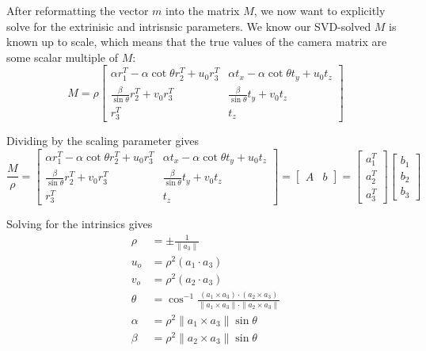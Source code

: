 \documentclass[a4paper, 12pt]{article}
\begin{document}
After reformatting the vector $m$ into the matrix $M$, we now want to explicitly solve for the extrinisic and intrisnsic parameters. We know our SVD-solved $M$ is known up to scale, which means that the true values of the camera matrix are some scalar multiple of $M$:
\begin{equation}
M = \rho\begin{bmatrix}
\alpha r_1^T - \alpha\cot \theta r_2^T + u_0r_3^T & \alpha t_x - \alpha \cot \theta t_y + u_0 t_z \\
\frac{\beta}{\sin\theta}r_2^T + v_0r_3^T & \frac{\beta}{\sin\theta}t_y + v_0t_z \\ r_3^T & t_z
\end{bmatrix}
\end{equation}

Dividing by the scaling parameter gives
\[\frac{M}{\rho} = \begin{bmatrix}
\alpha r_1^T - \alpha\cot \theta r_2^T + u_0r_3^T & \alpha t_x - \alpha \cot \theta t_y + u_0 t_z \\
\frac{\beta}{\sin\theta}r_2^T + v_0r_3^T & \frac{\beta}{\sin\theta}t_y + v_0t_z \\ r_3^T & t_z
\end{bmatrix} = \begin{bmatrix}A & b\end{bmatrix} =\begin{bmatrix}
a_1^T \\ a_2^T \\ a_3^T
\end{bmatrix} \begin{bmatrix}
b_1\\b_2\\b_3
\end{bmatrix}
\]

Solving for the intrinsics gives 
\begin{equation}\begin{aligned}
    \rho &= \pm \frac{1}{\|a_3\|}\\
    u_o &= \rho^2(a_1\cdot a_3)\\
    v_o &=\rho^2(a_2\cdot a_3)\\
    \theta &= \cos ^{-1} \frac{(a_1 \times a_3)\cdot(a_2\times a_3)}{\|a_1\times a_3\|\cdot\|a_2\times a_3\|}\\
    \alpha &= \rho^2 \|a_1 \times a_3\| \sin \theta\\
    \beta &= \rho^2 \|a_2 \times a_3\| \sin \theta
\end{aligned}\end{equation}
\end{document}
